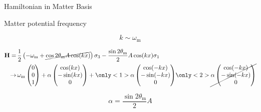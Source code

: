 \begin{frame}{Hamiltonian in Matter Basis}




Matter potential frequency

\begin{equation*}
    k\sim \omega_{\mathrm m}
\end{equation*}


\begin{align*}
    \mathbf {H} =\,& \frac{1}{2}\left( - \omega_{\mathrm{m}}
    +\cancel{
     \cos 2\theta_{\mathrm{m}}{A\cos(kx)} } \right) \sigma_3 - \frac{  \sin 2\theta_{\mathrm{m}
    }
    }{2}{A \cos(kx)}  \sigma_1 \\
    \to\, &  \omega_{\mathrm m}\begin{pmatrix}
    0\\
    0\\
    1
    \end{pmatrix} + \alpha \begin{pmatrix}
    \cos (kx)\\
    -\sin(k x)\\
    0
    \end{pmatrix}  + \only<1>{\alpha \begin{pmatrix}
    \cos (-kx)\\
    -\sin( - k x)\\
    0
    \end{pmatrix}
    }
    \only<2>{\cancel{\alpha \begin{pmatrix}
    \cos (-kx)\\
    -\sin( - k x)\\
    0
    \end{pmatrix}
    }
    }
\end{align*}

\begin{equation*}
\alpha = \frac{\sin2\theta_{\mathrm m}}{2}A
\end{equation*}







\end{frame}



